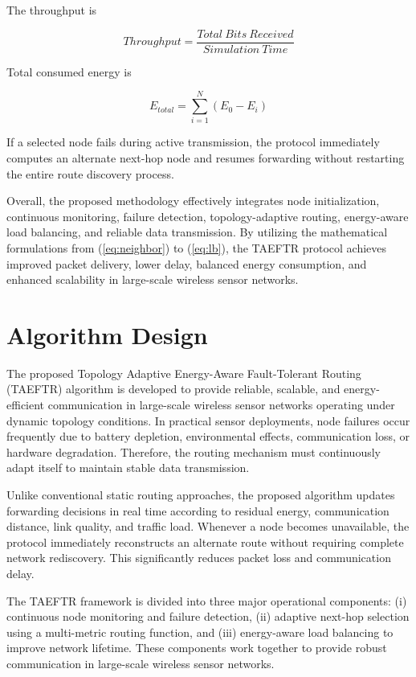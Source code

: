 \documentclass[a4paper,fleqn]{cas-dc}
\numberwithin{equation}{section}
\begin{document}
The throughput is

\begin{equation}
Throughput=\frac{Total\ Bits\ Received}{Simulation\ Time}
\end{equation}

Total consumed energy is

\begin{equation}
E_{total}=\sum_{i=1}^{N}(E_0-E_i)
\end{equation}

If a selected node fails during active transmission, the protocol immediately computes an alternate next-hop node and resumes forwarding without restarting the entire route discovery process.

Overall, the proposed methodology effectively integrates node initialization, continuous monitoring, failure detection, topology-adaptive routing, energy-aware load balancing, and reliable data transmission. By utilizing the mathematical formulations from (\ref{eq:neighbor}) to (\ref{eq:lb}), the TAEFTR protocol achieves improved packet delivery, lower delay, balanced energy consumption, and enhanced scalability in large-scale wireless sensor networks.
\section{Algorithm Design}

The proposed Topology Adaptive Energy-Aware Fault-Tolerant Routing (TAEFTR) algorithm is developed to provide reliable, scalable, and energy-efficient communication in large-scale wireless sensor networks operating under dynamic topology conditions. In practical sensor deployments, node failures occur frequently due to battery depletion, environmental effects, communication loss, or hardware degradation. Therefore, the routing mechanism must continuously adapt itself to maintain stable data transmission.

Unlike conventional static routing approaches, the proposed algorithm updates forwarding decisions in real time according to residual energy, communication distance, link quality, and traffic load. Whenever a node becomes unavailable, the protocol immediately reconstructs an alternate route without requiring complete network rediscovery. This significantly reduces packet loss and communication delay.

The TAEFTR framework is divided into three major operational components: (i) continuous node monitoring and failure detection, (ii) adaptive next-hop selection using a multi-metric routing function, and (iii) energy-aware load balancing to improve network lifetime. These components work together to provide robust communication in large-scale wireless sensor networks.
\end{document}

